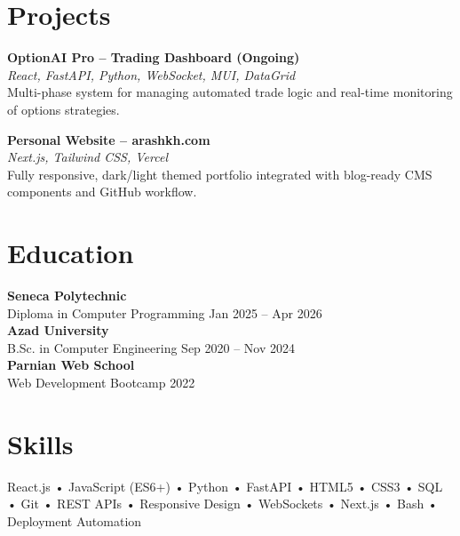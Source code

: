 \documentclass[letterpaper,11pt]{article}
\begin{document}
\vspace{0.6em}

\section*{Projects}
\textbf{OptionAI Pro – Trading Dashboard (Ongoing)}\\
\textit{React, FastAPI, Python, WebSocket, MUI, DataGrid}\\
Multi-phase system for managing automated trade logic and real-time monitoring of options strategies.

\vspace{0.5em}

\textbf{Personal Website – arashkh.com}\\
\textit{Next.js, Tailwind CSS, Vercel}\\
Fully responsive, dark/light themed portfolio integrated with blog-ready CMS components and GitHub workflow.

\vspace{0.6em}

\section*{Education}
\textbf{Seneca Polytechnic}\\
Diploma in Computer Programming \hfill Jan 2025 -- Apr 2026\\

\textbf{Azad University}\\
B.Sc. in Computer Engineering \hfill Sep 2020 -- Nov 2024\\

\textbf{Parnian Web School}\\
Web Development Bootcamp \hfill 2022

\vspace{0.6em}

\section*{Skills}
React.js • JavaScript (ES6+) • Python • FastAPI • HTML5 • CSS3 • SQL • Git • REST APIs • Responsive Design • WebSockets • Next.js • Bash • Deployment Automation
\end{document}
